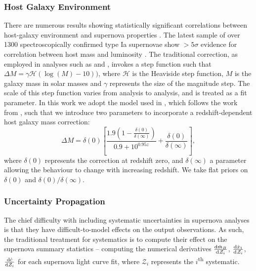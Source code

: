 \documentclass[a4paper,fleqn,usenatbib,manuscript]{emulateapj}
\newcommand{\blue}{\color{blue}}
\newcommand{\Z}{\mathcal{Z}}
\newcommand{\rubin}{\citetalias{Rubin2015}}
\begin{document}
\subsubsection{Host Galaxy Environment}
\label{sec:hostgal}

There are numerous results showing statistically significant correlations between host-galaxy environment and supernova properties \citep{Kelly2010, Lampeitl2010, Sullivan2010, DAndrea2011, Gupta2011, Johansson2013, Rigault2013}. The latest sample of over 1300 spectroscopically confirmed type Ia supernovae show $>5\sigma$ evidence for correlation between host mass and luminosity \citep{Uddin2017}. The traditional correction, as employed in analyses such as \citet{Suzuki2012} and \citet{Betoule2014}, invokes a step function such that $\Delta M = \gamma \mathcal{H}(\log(M) - 10))$, where $\mathcal{H}$ is the Heaviside step function, $M$ is the galaxy mass in solar masses and $\gamma$ represents the size of the magnitude step. The scale of this step function varies from analysis to analysis, and is treated as a fit parameter. In this work we adopt the model used in {\rubin}, which follows the work from \citet{Rigault2013}, such that we introduce two parameters to incorporate a redshift-dependent host galaxy mass correction:
\begin{equation}
\Delta M = \delta(0) \left[ \frac{1.9\left(1 - \frac{\delta(0)}{\delta(\infty)}\right)  }{0.9 + 10^{0.95z}} + \frac{\delta(0)}{\delta(\infty)}\right], \label{eq:mass}
\end{equation}
where $\delta(0)$ represents the correction at redshift zero, and $\delta(\infty)$ a parameter allowing the behaviour to change with increasing redshift. We take flat priors on $\delta(0)$ and $\delta(0)/\delta(\infty)$.



\subsubsection{Uncertainty Propagation}
\label{sec:systreat}
The chief difficulty with including systematic uncertainties in supernova analyses is that they have difficult-to-model effects on the output observations. As such, the traditional treatment for systematics is to compute their effect on the supernova summary statistics -- computing the numerical derivatives $\frac{{\rm d} \hat{m}_B}{{\rm d} \Z_i}$, $\frac{{\rm d} \hat{x}_1}{{\rm d} \Z_i}$, $\frac{{\rm d} \hat{c}}{{\rm d} \Z_i}$ {\blue for each supernova light curve fit}, where $\Z_i$ represents the $i$\textsuperscript{th} systematic.
\end{document}

